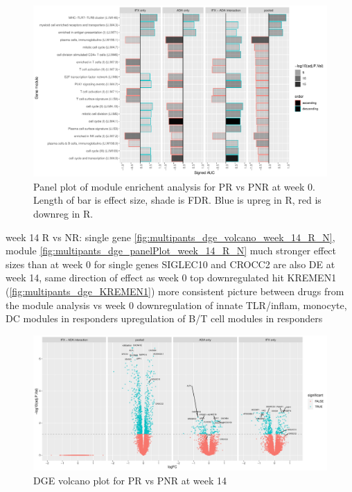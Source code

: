 \begin{outline}
\begin{figure}
    \centering
    \includegraphics[width=1.0\textwidth,page=1]{mainmatter/figures/chapter_04/plot_gene_set_enrichment.tmodCERNO_panelplot_C_1RI_1NI,C_1RA_1NA,C_(1RI_1NI)_(1RA_1NA),C_1R_1N.pdf}
    \caption{Panel plot of module enrichent analysis for PR vs PNR at week 0. Length of bar is effect size, shade is FDR. Blue is upreg in R, red is downreg in R.}
    \label{fig:multipants_dge_panelPlot_week_0_R_N}
\end{figure}

\1 week 14 R vs NR: single gene \autoref{fig:multipants_dge_volcano_week_14_R_N}, module \autoref{fig:multipants_dge_panelPlot_week_14_R_N}
    \2 much stronger effect sizes than at week 0 for single genes
        \3 SIGLEC10 and CROCC2 are also DE at week 14, same direction of effect as week 0
        \3 top downregulated hit KREMEN1 (\autoref{fig:multipants_dge_KREMEN1}) 
    \2 more consistent picture between drugs from the module analysis vs week 0
        \3 downregulation of innate TLR/inflam, monocyte, DC modules in responders
        \3 upregulation of B/T cell modules in responders

\begin{figure}
    \centering
    \includegraphics[width=1.0\textwidth,page=1]{mainmatter/figures/chapter_04/plot_gene_set_enrichment.dge_result_volcano_C_3RI_3NI,C_3RA_3NA,C_(3RI_3NI)_(3RA_3NA),C_3R_3N.pdf}
    \caption{DGE volcano plot for PR vs PNR at week 14}
    \label{fig:multipants_dge_volcano_week_14_R_N}
\end{figure}


\end{outline}
